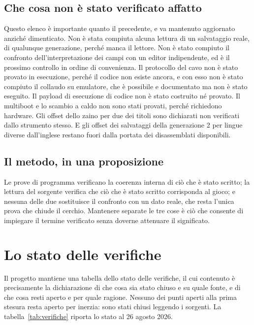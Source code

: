 \subsection{Che cosa non è stato verificato affatto}

Questo elenco è importante quanto il precedente, e va mantenuto aggiornato anziché dimenticato. Non è stata compiuta alcuna lettura di un salvataggio reale, di qualunque generazione, perché manca il lettore. Non è stato compiuto il confronto dell'interpretazione dei campi con un editor indipendente, ed è il prossimo controllo in ordine di convenienza. Il protocollo del cavo non è stato provato in esecuzione, perché il codice non esiste ancora, e con esso non è stato compiuto il collaudo su emulatore, che è possibile e documentato ma non è stato eseguito. Il payload di esecuzione di codice non è stato costruito né provato. Il multiboot e lo scambio a caldo non sono stati provati, perché richiedono hardware. Gli offset dello zaino per due dei titoli sono dichiarati non verificati dallo strumento stesso. E gli offset dei salvataggi della generazione 2 per lingue diverse dall'inglese restano fuori dalla portata dei disassemblati disponibili.

\subsection{Il metodo, in una proposizione}

Le prove di programma verificano la coerenza interna di ciò che è stato scritto; la lettura del sorgente verifica che ciò che è stato scritto corrisponda al gioco; e nessuna delle due sostituisce il confronto con un dato reale, che resta l'unica prova che chiude il cerchio. Mantenere separate le tre cose è ciò che consente di impiegare il termine verificato senza doverne attenuare il significato.

\section{Lo stato delle verifiche}

Il progetto mantiene una tabella dello stato delle verifiche, il cui contenuto è precisamente la dichiarazione di che cosa sia stato chiuso e su quale fonte, e di che cosa resti aperto e per quale ragione. Nessuno dei punti aperti alla prima stesura resta aperto per inerzia: sono stati chiusi leggendo i sorgenti. La tabella~\ref{tab:verifiche} riporta lo stato al 26 agosto 2026.

